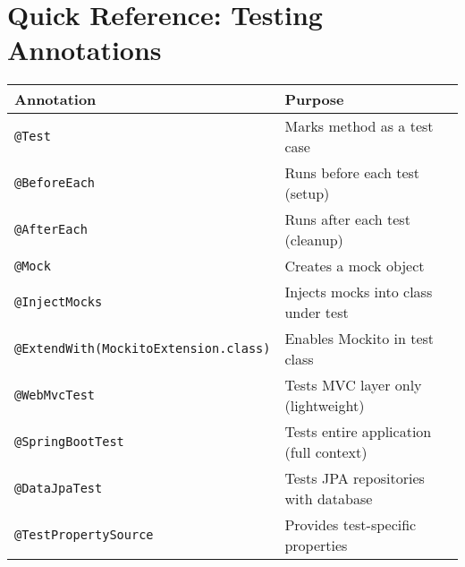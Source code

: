 \documentclass[12pt,a4paper]{article}
\begin{document}
\section{Quick Reference: Testing Annotations}

\begin{table}[H]
\centering
\small
\begin{tabularx}{\textwidth}{|l|X|}
\toprule
\textbf{Annotation} & \textbf{Purpose} \\
\midrule
\texttt{@Test} & Marks method as a test case \\
\texttt{@BeforeEach} & Runs before each test (setup) \\
\texttt{@AfterEach} & Runs after each test (cleanup) \\
\texttt{@Mock} & Creates a mock object \\
\texttt{@InjectMocks} & Injects mocks into class under test \\
\texttt{@ExtendWith(MockitoExtension.class)} & Enables Mockito in test class \\
\texttt{@WebMvcTest} & Tests MVC layer only (lightweight) \\
\texttt{@SpringBootTest} & Tests entire application (full context) \\
\texttt{@DataJpaTest} & Tests JPA repositories with database \\
\texttt{@TestPropertySource} & Provides test-specific properties \\
\bottomrule
\end{tabularx}
\end{table}
\end{document}
